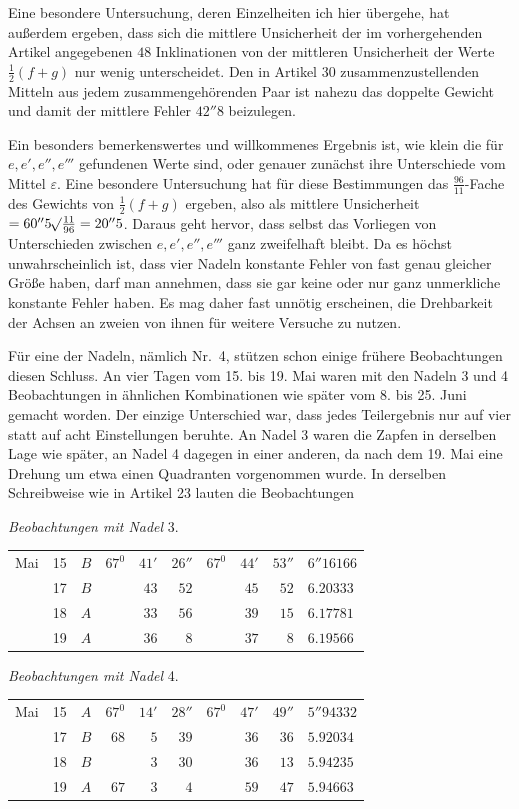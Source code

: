 Eine besondere Untersuchung, deren Einzelheiten ich hier übergehe, hat außerdem ergeben, dass sich die mittlere Unsicherheit der im vorhergehenden Artikel angegebenen $48$ Inklinationen von der mittleren Unsicherheit der Werte $\tfrac12(f+g)$ nur wenig unterscheidet. Den in Artikel 30 zusammenzustellenden Mitteln aus jedem zusammengehörenden Paar ist nahezu das doppelte Gewicht und damit der mittlere Fehler $42''8$ beizulegen.

Ein besonders bemerkenswertes und willkommenes Ergebnis ist, wie klein die für $e,e',e'',e'''$ gefundenen Werte sind, oder genauer zunächst ihre Unterschiede vom Mittel $\varepsilon$. Eine besondere Untersuchung hat für diese Bestimmungen das $\frac{96}{11}$-Fache des Gewichts von $\tfrac12(f+g)$ ergeben, also als mittlere Unsicherheit $=60''5\mathord{{}^{}\!\surd}\frac{11}{96}=20''5$. Daraus geht hervor, dass selbst das Vorliegen von Unterschieden zwischen $e,e',e'',e'''$ ganz zweifelhaft bleibt. Da es höchst unwahrscheinlich ist, dass vier Nadeln konstante Fehler von fast genau gleicher Größe haben, darf man annehmen, dass sie gar keine oder nur ganz unmerkliche konstante Fehler haben. Es mag daher fast unnötig erscheinen, die Drehbarkeit der Achsen an zweien von ihnen für weitere Versuche zu nutzen.

Für eine der Nadeln, nämlich Nr.\ 4, stützen schon einige frühere Beobachtungen diesen Schluss. An vier Tagen vom 15. bis 19. Mai waren mit den Nadeln 3 und 4 Beobachtungen in ähnlichen Kombinationen wie später vom 8. bis 25. Juni gemacht worden. Der einzige Unterschied war, dass jedes Teilergebnis nur auf vier statt auf acht Einstellungen beruhte. An Nadel 3 waren die Zapfen in derselben Lage wie später, an Nadel 4 dagegen in einer anderen, da nach dem 19. Mai eine Drehung um etwa einen Quadranten vorgenommen wurde. In derselben Schreibweise wie in Artikel 23 lauten die Beobachtungen

\begin{center}\textit{Beobachtungen mit Nadel} 3.

\begin{tabular}{rr|c|rrr|rrr|l}
Mai&15&$B$&$67^0$&$41'$&$26''$&$67^0$&$44'$&$53''$&$6''16166$\\
&17&$B$&&$43$&$52$&&$45$&$52$&$6.20333$\\
&18&$A$&&$33$&$56$&&$39$&$15$&$6.17781$\\
&19&$A$&&$36$&$8$&&$37$&$8$&$6.19566$
\end{tabular}
\end{center}
\begin{center}\textit{Beobachtungen mit Nadel} 4.

\begin{tabular}{rr|c|rrr|rrr|l}
Mai&15&$A$&$67^0$&$14'$&$28''$&$67^0$&$47'$&$49''$&$5''94332$\\
&17&$B$&$68$&$5$&$39$&&$36$&$36$&$5.92034$\\
&18&$B$&&$3$&$30$&&$36$&$13$&$5.94235$\\
&19&$A$&$67$&$3$&$4$&&$59$&$47$&$5.94663$
\end{tabular}
\end{center}


